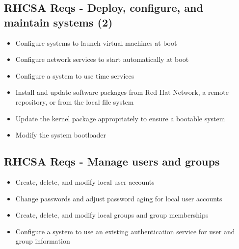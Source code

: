 \documentclass[letterpaper,10pt,english]{sphinxmanual}
\begin{document}
\subsection{RHCSA Reqs - Deploy, configure, and maintain systems (2)}
\label{rhcsa:rhcsa-reqs-deploy-configure-and-maintain-systems-2}\begin{itemize}
\item {} 
Configure systems to launch virtual machines at boot

\item {} 
Configure network services to start automatically at boot

\item {} 
Configure a system to use time services

\item {} 
Install and update software packages from Red Hat Network, a remote repository, or from the local file system

\item {} 
Update the kernel package appropriately to ensure a bootable system

\item {} 
Modify the system bootloader

\end{itemize}


\subsection{RHCSA Reqs - Manage users and groups}
\label{rhcsa:rhcsa-reqs-manage-users-and-groups}\begin{itemize}
\item {} 
Create, delete, and modify local user accounts

\item {} 
Change passwords and adjust password aging for local user accounts

\item {} 
Create, delete, and modify local groups and group memberships

\item {} 
Configure a system to use an existing authentication service for user and group information

\end{itemize}
\end{document}
